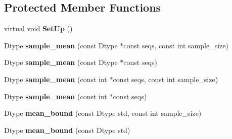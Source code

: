 \subsection*{Protected Member Functions}
\begin{DoxyCompactItemize}
\item 
\mbox{\label{classcaffe_1_1_random_number_generator_test_a0f16d083efcd9e6d096e0f533c3dbb42}} 
virtual void {\bfseries Set\+Up} ()
\item 
\mbox{\label{classcaffe_1_1_random_number_generator_test_a8e47e8eb974abd9f96c6e1421b91001b}} 
Dtype {\bfseries sample\+\_\+mean} (const Dtype $\ast$const seqs, const int sample\+\_\+size)
\item 
\mbox{\label{classcaffe_1_1_random_number_generator_test_a1a5c0259b52a872366cff6e6158c38df}} 
Dtype {\bfseries sample\+\_\+mean} (const Dtype $\ast$const seqs)
\item 
\mbox{\label{classcaffe_1_1_random_number_generator_test_adba69089a2fe1e1f27533ee2a4ffa73f}} 
Dtype {\bfseries sample\+\_\+mean} (const int $\ast$const seqs, const int sample\+\_\+size)
\item 
\mbox{\label{classcaffe_1_1_random_number_generator_test_a43d7d4b986410448721bfa79a73f62b8}} 
Dtype {\bfseries sample\+\_\+mean} (const int $\ast$const seqs)
\item 
\mbox{\label{classcaffe_1_1_random_number_generator_test_a4f23f81c31dc80dca93311ecc4ca8799}} 
Dtype {\bfseries mean\+\_\+bound} (const Dtype std, const int sample\+\_\+size)
\item 
\mbox{\label{classcaffe_1_1_random_number_generator_test_a32a1604e0358efaf9fdfa08ecc102cc0}} 
Dtype {\bfseries mean\+\_\+bound} (const Dtype std)
\item 
\mbox{\label{classcaffe_1_1_random_number_generator_test_a33e80e026c65bfa736e5fadd042cad7b}} 

\end{DoxyCompactItemize}
